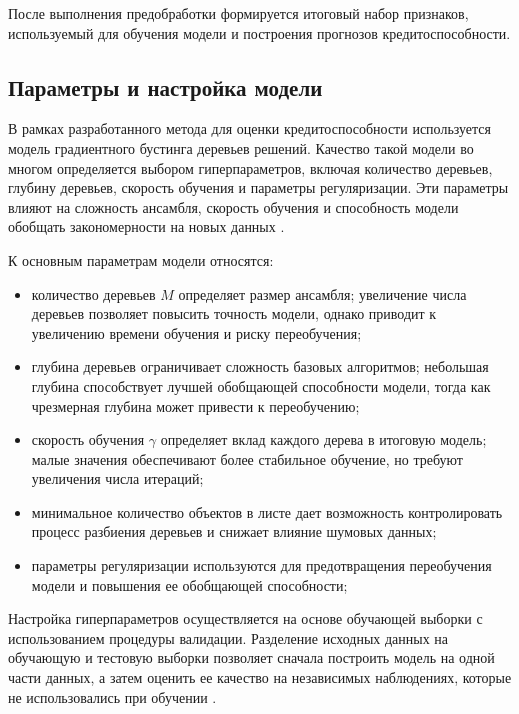 После выполнения предобработки формируется итоговый набор признаков, используемый для обучения модели и построения прогнозов кредитоспособности.


\subsection{Параметры и настройка модели}

В рамках разработанного метода для оценки кредитоспособности используется модель градиентного бустинга деревьев решений. Качество такой модели во многом определяется выбором гиперпараметров, включая количество деревьев, глубину деревьев, скорость обучения и параметры регуляризации. Эти параметры влияют на сложность ансамбля, скорость обучения и способность модели обобщать закономерности на новых данных \cite{HastieElementsBoosting}.

К основным параметрам модели относятся:

\begin{itemize}
  \item количество деревьев $M$ определяет размер ансамбля; увеличение числа деревьев позволяет повысить точность модели, однако приводит к увеличению времени обучения и риску переобучения;

  \item глубина деревьев ограничивает сложность базовых алгоритмов; небольшая глубина способствует лучшей обобщающей способности модели, тогда как чрезмерная глубина может привести к переобучению;

  \item скорость обучения $\gamma$ определяет вклад каждого дерева в итоговую модель; малые значения обеспечивают более стабильное обучение, но требуют увеличения числа итераций;

  \item минимальное количество объектов в листе дает возможность контролировать процесс разбиения деревьев и снижает влияние шумовых данных;

  \item параметры регуляризации используются для предотвращения переобучения модели и повышения ее обобщающей способности;
\end{itemize}

Настройка гиперпараметров осуществляется на основе обучающей выборки с использованием процедуры валидации. Разделение исходных данных на обучающую и тестовую выборки позволяет сначала построить модель на одной части данных, а затем оценить ее качество на независимых наблюдениях, которые не использовались при обучении \cite{BishopPatternRecognition}.

